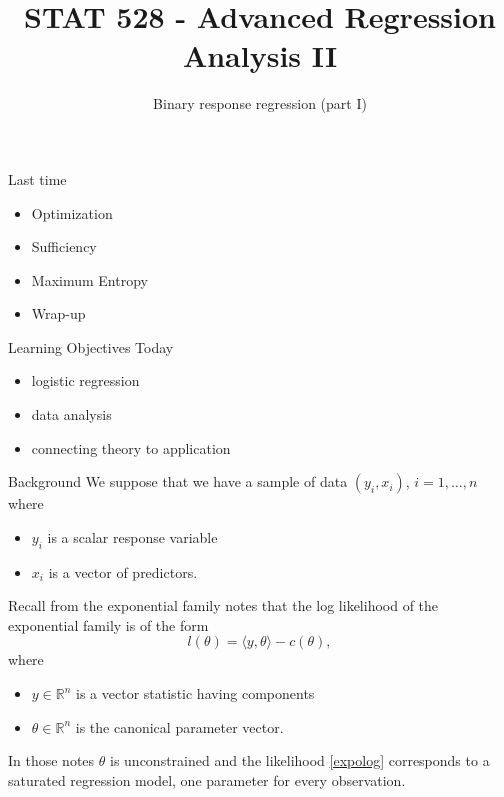 \documentclass[
  ignorenonframetext,
]{beamer}
\title{STAT 528 - Advanced Regression Analysis II}
\author{Binary response regression (part I)}
\date{}
\institute{Daniel J. Eck\\
Department of Statistics\\
University of Illinois}
\providecommand{\tightlist}{%
  \setlength{\itemsep}{0pt}\setlength{\parskip}{0pt}}
\begin{document}
\frame{\titlepage}

\begin{frame}
\newcommand{\R}{\mathbb{R}}
\newcommand{\Prob}{\mathbb{P}}
\newcommand{\Proj}{\textbf{P}}
\newcommand{\Hcal}{\mathcal{H}}
\newcommand{\rootn}{\sqrt{n}}
\newcommand{\p}{\mathbf{p}}
\newcommand{\E}{\text{E}}
\newcommand{\Var}{\text{Var}}
\newcommand{\Cov}{\text{Cov}}
\newcommand{\pibf}{\bm{\pi}}
\newcommand{\logit}{\text{logit}}

\newtheorem{cor}{Corollary}
\newtheorem{lem}{Lemma}
\newtheorem{thm}{Theorem}
\newtheorem{defn}{Definition}
\newtheorem{prop}{Proposition}
\end{frame}

\begin{frame}{Last time}
\protect\hypertarget{last-time}{}
\begin{itemize}
\tightlist
\item
  Optimization
\item
  Sufficiency
\item
  Maximum Entropy
\item
  Wrap-up
\end{itemize}
\end{frame}

\begin{frame}{Learning Objectives Today}
\protect\hypertarget{learning-objectives-today}{}
\begin{itemize}
\tightlist
\item
  logistic regression
\item
  data analysis
\item
  connecting theory to application
\end{itemize}
\end{frame}

\begin{frame}{Background}
\protect\hypertarget{background}{}
We suppose that we have a sample of data \((y_i,x_i)\),
\(i = 1,\ldots, n\) where

\begin{itemize}
\tightlist
\item
  \(y_i\) is a scalar response variable
\item
  \(x_i\) is a vector of predictors.
\end{itemize}

Recall from the exponential family notes that the log likelihood of the
exponential family is of the form \begin{equation} \label{expolog}
    l(\theta) = \langle y, \theta \rangle - c(\theta),
\end{equation} where

\begin{itemize}
\tightlist
\item
  \(y \in \mathbb{R}^n\) is a vector statistic having components
\item
  \(\theta \in \mathbb{R}^n\) is the canonical parameter vector.
\end{itemize}

In those notes \(\theta\) is unconstrained and the likelihood
\eqref{expolog} corresponds to a saturated regression model, one
parameter for every observation.
\end{frame}
\end{document}
